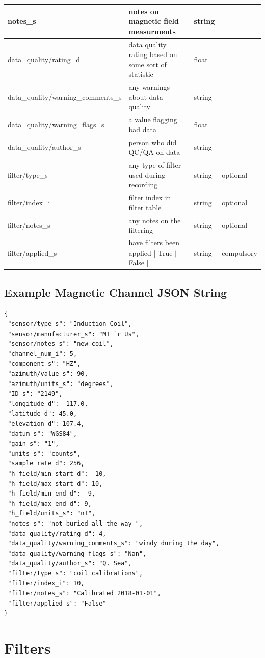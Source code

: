 \documentclass{article}
\begin{document}
\begin{table}[htb!]
\begin{tabular}{|l|p{3in}|l|l|}
		notes\_s & notes on magnetic field measurments & string &  \\ \hline
		data\_quality/rating\_d & data quality rating based on some sort of statistic & float &  \\ \hline
		data\_quality/warning\_comments\_s & any warnings about data quality & string &  \\ \hline
		data\_quality/warning\_flags\_s & a value flagging bad data  & float &  \\ \hline
		data\_quality/author\_s & person who did QC/QA on data & string &  \\ \hline
		filter/type\_s & any type of filter used during recording & string &  optional \\ \hline
		filter/index\_i & filter index in filter table & string &  optional \\ \hline
		filter/notes\_s & any notes on the filtering & string &  optional \\ \hline
		filter/applied\_s & have filters been applied [ True $|$ False ] & string & compulsory \\ \hline
		\end{tabular}
	\label{tab:magnetic}
\end{table}

\newpage
\subsection{Example Magnetic Channel JSON String}

\begin{verbatim}
{
 "sensor/type_s": "Induction Coil",
 "sensor/manufacturer_s": "MT `r Us",
 "sensor/notes_s": "new coil",
 "channel_num_i": 5,
 "component_s": "HZ",
 "azimuth/value_s": 90,
 "azimuth/units_s": "degrees",
 "ID_s": "2149",
 "longitude_d": -117.0,
 "latitude_d": 45.0,
 "elevation_d": 107.4,
 "datum_s": "WGS84",
 "gain_s": "1",
 "units_s": "counts",
 "sample_rate_d": 256,
 "h_field/min_start_d": -10,
 "h_field/max_start_d": 10,
 "h_field/min_end_d": -9,
 "h_field/max_end_d": 9,
 "h_field/units_s": "nT",
 "notes_s": "not buried all the way ",
 "data_quality/rating_d": 4,
 "data_quality/warning_comments_s": "windy during the day",
 "data_quality/warning_flags_s": "Nan",
 "data_quality/author_s": "Q. Sea",
 "filter/type_s": "coil calibrations",
 "filter/index_i": 10,
 "filter/notes_s": "Calibrated 2018-01-01",
 "filter/applied_s": "False"
}
\end{verbatim}

\newpage
\section{Filters}
\end{document}
